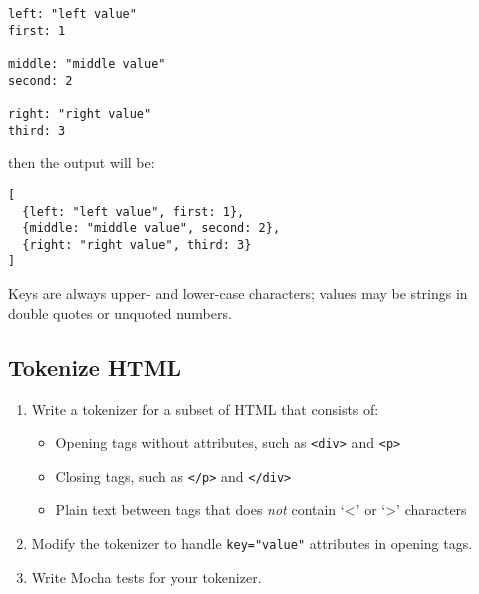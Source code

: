\documentclass[krantzl]{krantz}
\begin{document}
\begin{lstlisting}[frame=tblr]
left: "left value"
first: 1

middle: "middle value"
second: 2

right: "right value"
third: 3
\end{lstlisting}


\noindent then the output will be:

\begin{lstlisting}[frame=tblr]
[
  {left: "left value", first: 1},
  {middle: "middle value", second: 2},
  {right: "right value", third: 3}
]
\end{lstlisting}


Keys are always upper- and lower-case characters;
values may be strings in double quotes or unquoted numbers.

\subsection*{Tokenize HTML}

\begin{enumerate}

\item 

Write a tokenizer for a subset of HTML that consists of:

\begin{itemize}

\item Opening tags without attributes, such as \texttt{<div>} and \texttt{<p>}

\item Closing tags, such as \texttt{</p>} and \texttt{</div>}

\item Plain text between tags that does \emph{not} contain ‘<’ or ‘>’ characters

\end{itemize}



\item 

Modify the tokenizer to handle \texttt{key="value"} attributes in opening tags.



\item 

Write Mocha tests for your tokenizer.



\end{enumerate}
\end{document}

